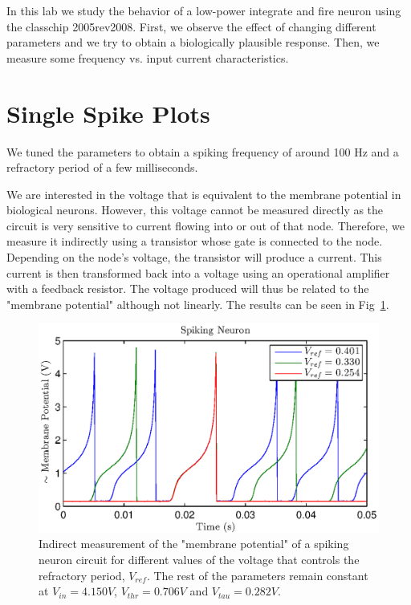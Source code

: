 

\newcommand{\reffig}[1]{Fig.~\ref{#1}}



\newpage
In this lab we study the behavior of a low-power integrate and fire neuron using the classchip 2005rev2008. First, we observe the effect of changing different parameters and we try to obtain a biologically plausible response. Then, we measure some frequency vs. input current characteristics. \\

\section{Single Spike Plots}

We tuned the parameters to obtain a spiking frequency of around 100 Hz and a refractory period of a few milliseconds. 

We are interested in the voltage that is equivalent to the membrane potential in biological neurons. However, this voltage cannot be measured directly as the circuit is very sensitive to current flowing into or out of that node. Therefore, we measure it indirectly using a transistor whose gate is connected to the node. Depending on the node's voltage, the transistor will produce a current. This current is then transformed back into a voltage using an operational amplifier with a feedback resistor. The voltage produced will thus be related to the "membrane potential" although not linearly. The results can be seen in Fig~\ref{fig:exp1a}. 
\begin{figure}[!h]
    \center
    \includegraphics{exp1a.eps}
    \caption{Indirect measurement of the "membrane potential" of a spiking neuron circuit for different values of the voltage that controls the refractory period, $V_{ref}$. The rest of the parameters remain constant at $V_{in}=4.150 V$, $V_{thr}=0.706 V$ and $V_{tau}=0.282 V$. }
    \label{fig:exp1a}
\end{figure}

